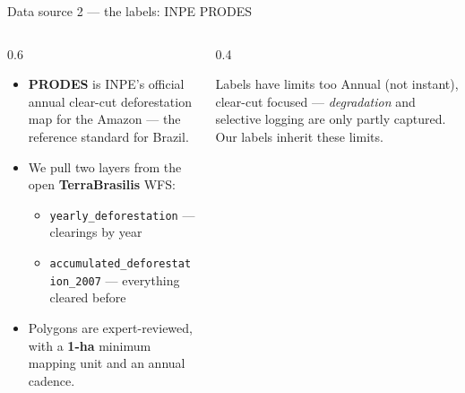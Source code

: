 \documentclass[aspectratio=169,11pt]{beamer}
\newcommand{\gtag}[1]{{\color{forestgreen}\textbf{#1}}}
\begin{document}
\begin{frame}{Data source 2 — the labels: INPE PRODES}
  \begin{columns}[T]
    \begin{column}{0.6\textwidth}
      \begin{itemize}
        \item \textbf{PRODES} is INPE's official annual clear-cut deforestation
              map for the Amazon — the reference standard for Brazil.
        \item We pull two layers from the open \textbf{TerraBrasilis} WFS:
              \begin{itemize}
                \item \texttt{yearly\_deforestation} — clearings by year
                \item \texttt{accumulated\_deforestation\_2007} — everything
                      cleared before
              \end{itemize}
        \item Polygons are expert-reviewed, with a \gtag{1-ha} minimum mapping
              unit and an annual cadence.
      \end{itemize}
    \end{column}
    \begin{column}{0.4\textwidth}
      \begin{alertblock}{Labels have limits too}
        Annual (not instant), clear-cut focused — \emph{degradation} and
        selective logging are only partly captured. Our labels inherit these
        limits.
      \end{alertblock}
    \end{column}
  \end{columns}
\end{frame}
\end{document}
